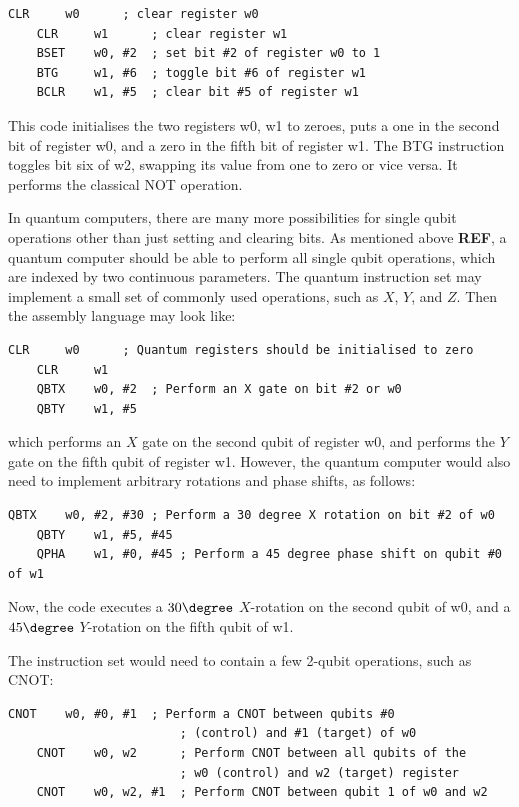 \begin{lstlisting}[language=Asm,caption={Single bit operations}]
    CLR     w0      ; clear register w0
    CLR     w1      ; clear register w1
    BSET    w0, #2  ; set bit #2 of register w0 to 1
    BTG     w1, #6  ; toggle bit #6 of register w1
    BCLR    w1, #5  ; clear bit #5 of register w1
\end{lstlisting}

This code initialises the two registers w0, w1 to zeroes, puts a one in the second bit of register w0, and a zero in the fifth bit of register w1. The BTG instruction toggles bit six of w2, swapping its value from one to zero or vice versa. It performs the classical NOT operation.

In quantum computers, there are many more possibilities for single qubit operations other than just setting and clearing bits. As mentioned above \textbf{REF}, a quantum computer should be able to perform all single qubit operations, which are indexed by two continuous parameters. The quantum instruction set may implement a small set of commonly used operations, such as $X$, $Y$, and $Z$. Then the assembly language may look like:

\begin{lstlisting}[language=Asm, caption={Quantum X and Y operations}]
    CLR     w0      ; Quantum registers should be initialised to zero
    CLR     w1      
    QBTX    w0, #2  ; Perform an X gate on bit #2 or w0
    QBTY    w1, #5  
\end{lstlisting}

which performs an $X$ gate on the second qubit of register w0, and performs the $Y$ gate on the fifth qubit of register w1. However, the quantum computer would also need to implement arbitrary rotations and phase shifts, as follows:  

\begin{lstlisting}[language=Asm, caption={Arbitrary single qubit rotations}]
    QBTX    w0, #2, #30 ; Perform a 30 degree X rotation on bit #2 of w0
    QBTY    w1, #5, #45
    QPHA    w1, #0, #45 ; Perform a 45 degree phase shift on qubit #0 of w1
\end{lstlisting}

Now, the code executes a $30\degree$ $X$-rotation on the second qubit of w0, and a $45\degree$ $Y$-rotation on the fifth qubit of w1.

The instruction set would need to contain a few 2-qubit operations, such as CNOT:
\begin{lstlisting}[language=Asm,caption={CNOT operations}]
    CNOT    w0, #0, #1  ; Perform a CNOT between qubits #0 
                        ; (control) and #1 (target) of w0
    CNOT    w0, w2      ; Perform CNOT between all qubits of the
                        ; w0 (control) and w2 (target) register 
    CNOT    w0, w2, #1  ; Perform CNOT between qubit 1 of w0 and w2 
\end{lstlisting}

